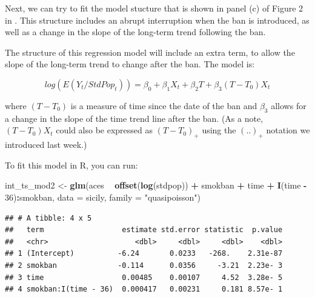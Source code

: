 \documentclass[
]{book}
\newenvironment{Shaded}{\begin{snugshade}}{\end{snugshade}}
\newcommand{\DataTypeTok}[1]{\textcolor[rgb]{0.13,0.29,0.53}{#1}}
\newcommand{\DecValTok}[1]{\textcolor[rgb]{0.00,0.00,0.81}{#1}}
\newcommand{\KeywordTok}[1]{\textcolor[rgb]{0.13,0.29,0.53}{\textbf{#1}}}
\newcommand{\NormalTok}[1]{#1}
\newcommand{\OperatorTok}[1]{\textcolor[rgb]{0.81,0.36,0.00}{\textbf{#1}}}
\newcommand{\StringTok}[1]{\textcolor[rgb]{0.31,0.60,0.02}{#1}}
\begin{document}
Next, we can try to fit the model stucture that is shown in panel (c) of Figure 2 in \citet{bernal2017interrupted}. This structure includes an abrupt interruption when the ban is introduced, as well as a change in the slope of the long-term trend following the ban.

The structure of this regression model will include an extra term, to allow the slope of the long-term trend to change after the ban. The model is:

\[
log(E(Y_t/StdPop_t)) = \beta_0 + \beta_1 X_t + \beta_2 T + \beta_3 (T-T_0)X_t
\]

where \((T-T_0)\) is a measure of time since the date of the ban and \(\beta_3\) allows for a change in the slope of the time trend line after the ban. (As a note, \((T-T_0)X_t\) could also be expressed as \((T-T_0)_+\) using the \((..)_+\) notation we introduced last week.)

To fit this model in R, you can run:

\begin{Shaded}
\begin{Highlighting}[]
\NormalTok{int_ts_mod2 <-}\StringTok{ }\KeywordTok{glm}\NormalTok{(aces }\OperatorTok{~}\StringTok{ }\KeywordTok{offset}\NormalTok{(}\KeywordTok{log}\NormalTok{(stdpop)) }\OperatorTok{+}\StringTok{ }\NormalTok{smokban }\OperatorTok{+}\StringTok{ }\NormalTok{time }\OperatorTok{+}\StringTok{ }
\StringTok{                     }\KeywordTok{I}\NormalTok{(time }\OperatorTok{-}\StringTok{ }\DecValTok{36}\NormalTok{)}\OperatorTok{:}\NormalTok{smokban, }
                      \DataTypeTok{data =}\NormalTok{ sicily, }
                      \DataTypeTok{family =} \StringTok{"quasipoisson"}\NormalTok{)}
\end{Highlighting}
\end{Shaded}

\begin{Shaded}
\end{Shaded}

\begin{verbatim}
## # A tibble: 4 x 5
##   term                  estimate std.error statistic  p.value
##   <chr>                    <dbl>     <dbl>     <dbl>    <dbl>
## 1 (Intercept)          -6.24       0.0233   -268.    2.31e-87
## 2 smokban              -0.114      0.0356     -3.21  2.23e- 3
## 3 time                  0.00485    0.00107     4.52  3.28e- 5
## 4 smokban:I(time - 36)  0.000417   0.00231     0.181 8.57e- 1
\end{verbatim}
\end{document}
